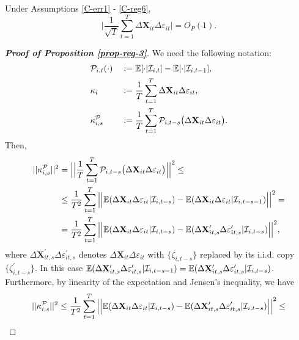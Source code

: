 \documentclass[a4paper,12pt]{article}
\begin{document}
\begin{prop}\label{prop-reg-3}
Under Assumptions \ref{C-err1} - \ref{C-reg6},
\[ \Big| \frac{1}{\sqrt{T}}\sum_{t=1}^T \Delta \mathbf{X}_{it}\Delta \varepsilon_{it} \Big| = O_P(1).
\]
\end{prop}

\begin{proof}[\textnormal{\textbf{Proof of Proposition \ref{prop-reg-3}}}]
We need the following notation:
\begin{alignat*}{2}
&\mathcal{P}_{i,t}(\cdot) &&:= \mathbb{E}[\cdot|\mathcal{I}_{i, t}] -\mathbb{E}[\cdot|\mathcal{I}_{i, t-1}], \\
&\kappa_{i} && := \frac{1}{T}\sum_{t=1}^T  \Delta \mathbf{X}_{it}\Delta \varepsilon_{it}, \\
&\kappa_{i, s}^{\mathcal{P}} && := \frac{1}{T}\sum_{t=1}^T \mathcal{P}_{i, t-s}\big( \Delta \mathbf{X}_{it}\Delta \varepsilon_{it}\big).
\end{alignat*}
Then,
\begin{align*}
||\kappa_{i, s}^{\mathcal{P}}||^2 &= \Big|\Big| \frac{1}{T}\sum_{t=1}^T \mathcal{P}_{i, t-s}\big( \Delta \mathbf{X}_{it}\Delta \varepsilon_{it}\big) \Big|\Big|^2 \leq\\
&\leq \frac{1}{T^2} \sum_{t=1}^T \Big|\Big| \mathbb{E} (\Delta \mathbf{X}_{it}\Delta \varepsilon_{it}|\mathcal{I}_{i, t-s}) -\mathbb{E} (\Delta \mathbf{X}_{it}\Delta \varepsilon_{it}|\mathcal{I}_{i, t-s-1}) \Big|\Big|^2 =\\
&= \frac{1}{T^2} \sum_{t=1}^T \Big|\Big| \mathbb{E} (\Delta \mathbf{X}_{it}\Delta \varepsilon_{it}|\mathcal{I}_{i, t-s}) -\mathbb{E} (\Delta \mathbf{X}_{it, s}^\prime\Delta \varepsilon_{it, s}^\prime|\mathcal{I}_{i, t-s}) \Big|\Big|^2,
\end{align*}
where $\Delta \mathbf{X}_{it, s}^\prime\Delta \varepsilon_{it, s}^\prime$ denotes $\Delta \mathbf{X}_{it}\Delta \varepsilon_{it}$ with $\{\zeta_{i, t-s}\}$ replaced by its i.i.d. copy $\{\zeta_{i, t-s}^\prime\}$. In this case $\mathbb{E} (\Delta \mathbf{X}_{it, s}^\prime\Delta \varepsilon_{it, s}^\prime|\mathcal{I}_{i, t-s -1}) = \mathbb{E} (\Delta \mathbf{X}_{it, s}^\prime\Delta \varepsilon_{it, s}^\prime|\mathcal{I}_{i, t-s})$. Furthermore, by linearity of the expectation and Jensen's inequality, we have 
\begin{align*}
||\kappa_{i, s}^{\mathcal{P}}||^2 &\leq \frac{1}{T^2} \sum_{t=1}^T \Big|\Big| \ex (\Delta \mathbf{X}_{it}\Delta \varepsilon_{it}|\mathcal{I}_{i, t-s}) -\ex (\Delta \mathbf{X}_{it, s}^\prime\Delta \varepsilon_{it, s}^\prime|\mathcal{I}_{i, t-s}) \Big|\Big|^2 \leq \\

\end{align*}
\end{proof}
\end{document}
